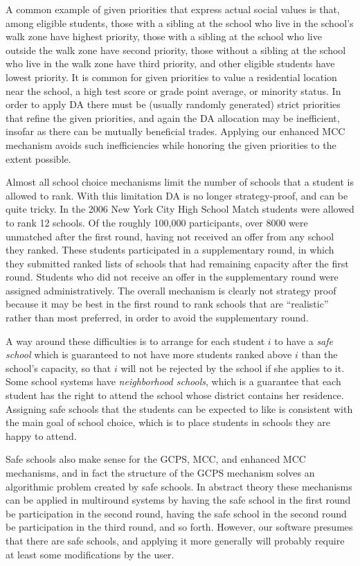 \documentclass[12pt]{article}
\theoremstyle{definition}
\begin{document}
A common example of given priorities that express actual social values
is that, among eligible students, those with a sibling at the school
who live in the school's walk zone have highest priority, those with a
sibling at the school who live outside the walk zone have second
priority, those without a sibling at the school who live in the walk
zone have third priority, and other eligible students have lowest
priority.  It is common for given priorities to value a residential
location near the school, a high test score or grade point average, or
minority status.  In order to apply DA there must be (usually randomly
generated) strict priorities that refine the given priorities, and
again the DA allocation may be inefficient, insofar as there can be
mutually beneficial trades.  Applying our enhanced MCC mechanism
avoids such inefficiencies while honoring the given priorities to the
extent possible.

Almost all school choice mechanisms limit the number of schools that a
student is allowed to rank.  With this limitation DA is no longer
strategy-proof, and can be quite tricky.  In the 2006 New York City
High School Match students were allowed to rank 12 schools.  Of the
roughly 100,000 participants, over 8000 were unmatched after the first
round, having not received an offer from any school they ranked.
These students participated in a supplementary round, in which they
submitted ranked lists of schools that had remaining capacity after
the first round.  Students who did not receive an offer in the
supplementary round were assigned administratively.  The overall
mechanism is clearly not strategy proof because it may be best in the
first round to rank schools that are ``realistic'' rather than most
preferred, in order to avoid the supplementary round.

A way around these difficulties is to arrange for each student $i$ to
have a \emph{safe school} which is guaranteed to not have more
students ranked above $i$ than the school's capacity, so that $i$ will
not be rejected by the school if she applies to it.  Some school
systems have \emph{neighborhood schools}, which is a guarantee that
each student has the right to attend the school whose district
contains her residence.  Assigning safe schools that the students can
be expected to like is consistent with the main goal of school choice,
which is to place students in schools they are happy to attend.

Safe schools also make sense for the GCPS, MCC, and enhanced MCC
mechanisms, and in fact the structure of the GCPS mechanism solves an
algorithmic problem created by safe schools.  In abstract theory these
mechanisms can be applied in multiround systems by having the safe
school in the first round be participation in the second round, having
the safe school in the second round be participation in the third
round, and so forth. However, our software presumes that there are
safe schools, and applying it more generally will probably require
at least some modifications by the user.
\end{document}
